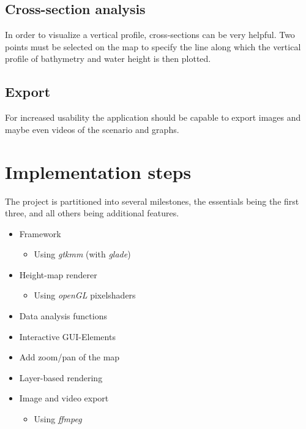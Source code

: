 \documentclass[paper=a4]{proc}
\begin{document}
			\subsection*{Cross-section analysis}
				In order to visualize a vertical profile, cross-sections can be very helpful. Two points must be selected on the map to specify the line along which the vertical profile of bathymetry and water height is then plotted.
		\subsection{Export}
			For increased usability the application should be capable to export images and maybe even videos of the scenario and graphs.
	\section{Implementation steps}
		The project is partitioned into several milestones, the essentials being the first three, and all others being additional features.
		\begin{itemize}
			\item Framework
			\begin{itemize}
				\item Using \emph{gtkmm} (with \emph{glade})
			\end{itemize}
			\item Height-map renderer
			\begin{itemize}
				\item Using \emph{openGL} pixelshaders
			\end{itemize}
			\item Data analysis functions
			\item Interactive GUI-Elements
			\item Add zoom/pan of the map
			\item Layer-based rendering
			\item Image and video export
			\begin{itemize}
				\item Using \emph{ffmpeg}
			\end{itemize}
		\end{itemize}
\end{document}
